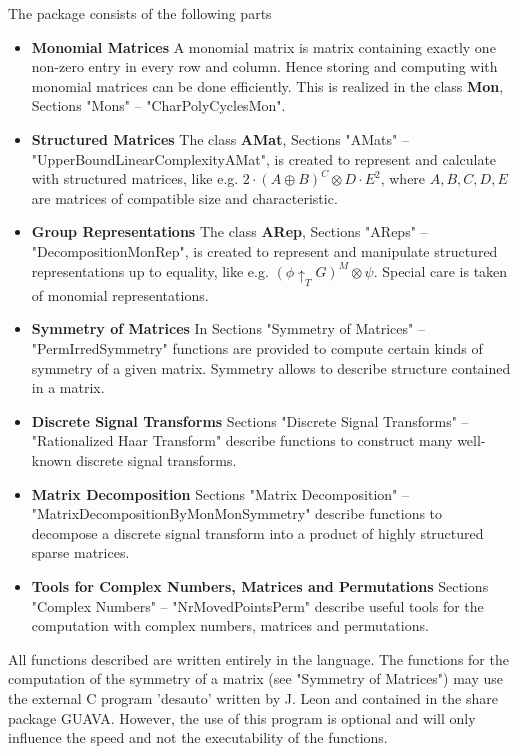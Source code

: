 The package {\AREP} consists of the following parts\:
\begin{itemize}
\item {\bf Monomial Matrices\:} A monomial matrix is matrix 
containing exactly one non-zero entry in every row and column. 
Hence storing and computing with monomial matrices can be done 
efficiently. This is realized in the class {\bf Mon}, 
Sections "Mons" -- "CharPolyCyclesMon". 

\item{\bf Structured Matrices\:} The class {\bf AMat}, 
Sections "AMats" -- "UpperBoundLinearComplexityAMat", is created to 
represent and calculate with structured matrices, like e.g. 
$2\cdot(A\oplus B)^C\otimes D\cdot E^2$, where $A, B, C, D, E$ are 
matrices of compatible size and characteristic. 

\item {\bf Group Representations\:} The class {\bf ARep}, 
Sections "AReps" -- "DecompositionMonRep", is created to 
represent and manipulate structured representations up to 
equality, like e.g. $(\phi\uparrow_T G)^M\otimes\psi$. 
Special care is taken of monomial representations.

\item {\bf Symmetry of Matrices\:} In 
Sections "Symmetry of Matrices" -- "PermIrredSymmetry" 
functions are provided 
to compute certain kinds of symmetry of a given matrix. 
Symmetry allows to describe structure contained in a matrix.

\item {\bf Discrete Signal Transforms\:} 
Sections "Discrete Signal Transforms" -- 
"Rationalized Haar Transform" describe functions to 
construct many well-known discrete signal transforms.

\item {\bf Matrix Decomposition\:} 
Sections "Matrix Decomposition" -- 
"MatrixDecompositionByMonMonSymmetry" describe functions
to decompose a discrete signal transform into a product 
of highly structured sparse matrices.

\item {\bf Tools for Complex Numbers, Matrices and Permutations\:} 
Sections "Complex Numbers" -- "NrMovedPointsPerm" describe
useful tools for the computation with complex numbers, matrices
and permutations.
\end{itemize}

All functions described are written entirely in the 
{\GAP} language. The functions for the computation of
the symmetry of a matrix (see "Symmetry of Matrices") 
may use the external C program 'desauto' written by J. Leon
and contained in the share package {\sf GUAVA}.
However, the use of this program is optional and will only 
influence the speed and not the executability of the functions.

